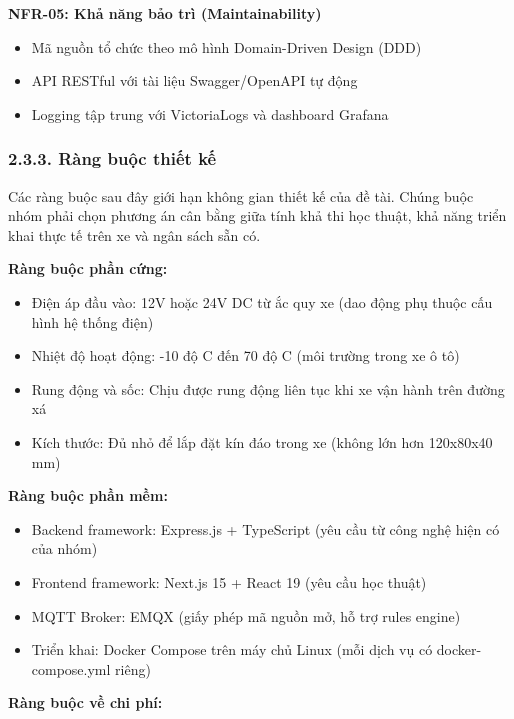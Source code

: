 \documentclass[a4paper]{extarticle}
\providecommand{\tightlist}{%
  \setlength{\itemsep}{0pt}\setlength{\parskip}{0pt}}
\begin{document}
\textbf{NFR-05: Khả năng bảo trì (Maintainability)}

\begin{itemize}
\tightlist
\item
  Mã nguồn tổ chức theo mô hình Domain-Driven Design (DDD)
\item
  API RESTful với tài liệu Swagger/OpenAPI tự động
\item
  Logging tập trung với VictoriaLogs và dashboard Grafana
\end{itemize}

\subsubsection{2.3.3. Ràng buộc thiết
kế}\label{233-ruxe0ng-buux1ed9c-thiux1ebft-kux1ebf}

Các ràng buộc sau đây giới hạn không gian thiết kế của đề tài. Chúng buộc
nhóm phải chọn phương án cân bằng giữa tính khả thi học thuật, khả năng
triển khai thực tế trên xe và ngân sách sẵn có.

\textbf{Ràng buộc phần cứng:}

\begin{itemize}
\tightlist
\item
  Điện áp đầu vào: 12V hoặc 24V DC từ ắc quy xe (dao động phụ thuộc cấu
  hình hệ thống điện)
\item
  Nhiệt độ hoạt động: -10 độ C đến 70 độ C (môi trường trong xe ô tô)
\item
  Rung động và sốc: Chịu được rung động liên tục khi xe vận hành trên
  đường xá
\item
  Kích thước: Đủ nhỏ để lắp đặt kín đáo trong xe (không lớn hơn
  120x80x40 mm)
\end{itemize}

\textbf{Ràng buộc phần mềm:}

\begin{itemize}
\tightlist
\item
  Backend framework: Express.js + TypeScript (yêu cầu từ công nghệ hiện
  có của nhóm)
\item
  Frontend framework: Next.js 15 + React 19 (yêu cầu học thuật)
\item
  MQTT Broker: EMQX (giấy phép mã nguồn mở, hỗ trợ rules engine)
\item
  Triển khai: Docker Compose trên máy chủ Linux (mỗi dịch vụ có
  docker-compose.yml riêng)
\end{itemize}

\textbf{Ràng buộc về chi phí:}
\end{document}

